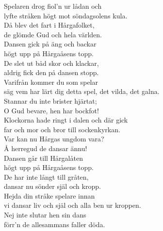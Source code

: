 \documentclass[a6paper,10pt]{article}
\begin{document}
\setlength{\oddsidemargin}{-0.47in}
\noindent
\begin{center}
\end{center}
\begin{lyrics}
Spelaren drog fiol'n ur lådan och\\
lyfte stråken högt mot söndagsolens kula.\\
Då blev det fart i Hårgafolket,\\
de glömde Gud och hela världen.
\vspace{5pt}\\
Dansen gick på äng och backar\\
högt upp på Hårgaåsens topp.\\
De slet ut båd skor och klackar,\\
aldrig fick den på dansen stopp.
\vspace{5pt}\\
Varifrån kommer du som spelar\\
säg vem har lärt dig detta spel, det vilda, det galna.\\
Stannar du inte brister hjärtat;\\
O Gud bevare, hen har bockfot!
\vspace{5pt}\\
Klockorna hade ringt i dalen och där gick\\
far och mor och bror till sockenkyrkan.\\
Var kan nu Hårgas ungdom vara?\\
Å herregud de dansar ännu!
\vspace{5pt}\\
Dansen går till Hårgalåten\\
högt upp på Hårgaåsens topp.\\
De har inte långt till gråten,\\
dansar nu sönder själ och kropp.
\vspace{5pt}\\
Hejda din stråke spelare innan \\
vi dansar liv och själ och alla ben ur kroppen.\\
Nej inte slutar hen sin dans \\
förr'n de allesammans faller döda.
\end{lyrics}
\end{document}
